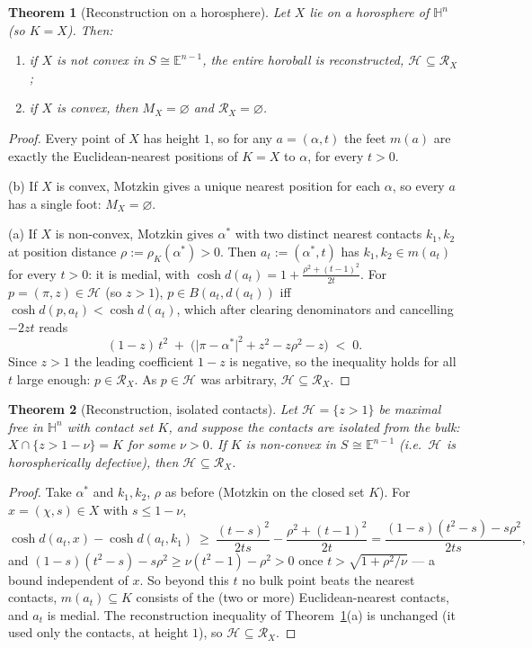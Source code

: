 \documentclass[11pt]{article}
\newtheorem{theorem}{Theorem}[section]
\theoremstyle{remark}
\newcommand{\X}{X}
\newcommand{\Mx}{M_{\X}}
\newcommand{\Rx}{\mathcal{R}_{\X}}
\newcommand{\Hb}[1]{\mathcal{H}_{#1}}
\newcommand{\Sb}[1]{S_{#1}}
\newcommand{\B}{B}
\begin{document}
\begin{theorem}[Reconstruction on a horosphere]\label{thm:hsphere}
Let $\X$ lie on a horosphere of $\mathbb{H}^{n}$ (so $K=\X$). Then:
\begin{enumerate}[label=(\alph*)]
\item if $\X$ is not convex in $\Sb{}\cong\mathbb{E}^{n-1}$, the entire
horoball is reconstructed, $\Hb{}\subseteq\Rx$;
\item if $\X$ is convex, then $\Mx=\varnothing$ and
$\Rx=\varnothing$.
\end{enumerate}
\end{theorem}

\begin{proof}
Every point of $\X$ has height $1$, so for any $a=(\alpha,t)$ the feet
$m(a)$ are exactly the Euclidean-nearest positions of $K=\X$ to
$\alpha$, for every $t>0$.

(b) If $\X$ is convex, Motzkin gives a unique nearest position for
each $\alpha$, so every $a$ has a single foot: $\Mx=\varnothing$.

(a) If $\X$ is non-convex, Motzkin gives $\alpha^{\ast}$ with two
distinct nearest contacts $k_{1},k_{2}$ at position distance
$\rho:=\rho_{K}(\alpha^{\ast})>0$. Then $a_{t}:=(\alpha^{\ast},t)$ has
$k_{1},k_{2}\in m(a_{t})$ for every $t>0$: it is medial, with
$\cosh d(a_{t})=1+\frac{\rho^{2}+(t-1)^{2}}{2t}$. For
$p=(\pi,z)\in\Hb{}$ (so $z>1$),
$p\in\B(a_{t},d(a_{t}))$ iff $\cosh d(p,a_{t})<\cosh d(a_{t})$, which
after clearing denominators and cancelling $-2zt$ reads
\[
(1-z)\,t^{2}\;+\;\bigl(\lvert\pi-\alpha^{\ast}\rvert^{2}+z^{2}-z\rho^{2}
-z\bigr)\;<\;0 .
\]
Since $z>1$ the leading coefficient $1-z$ is negative, so the
inequality holds for all $t$ large enough: $p\in\Rx$. As $p\in\Hb{}$
was arbitrary, $\Hb{}\subseteq\Rx$.
\end{proof}

\begin{theorem}[Reconstruction, isolated contacts]\label{thm:hiso}
Let $\Hb{}=\{z>1\}$ be maximal free in $\mathbb{H}^{n}$ with contact
set $K$, and suppose the contacts are \emph{isolated from the bulk}:
$\X\cap\{z>1-\nu\}=K$ for some $\nu>0$. If $K$ is non-convex in
$\Sb{}\cong\mathbb{E}^{n-1}$ (i.e.\ $\Hb{}$ is horospherically
defective), then $\Hb{}\subseteq\Rx$.
\end{theorem}

\begin{proof}
Take $\alpha^{\ast}$ and $k_{1},k_{2}$, $\rho$ as before (Motzkin on
the closed set $K$). For $x=(\chi,s)\in\X$ with $s\le1-\nu$,
\[
\cosh d(a_{t},x)-\cosh d(a_{t},k_{1})\ \ge\
\frac{(t-s)^{2}}{2ts}-\frac{\rho^{2}+(t-1)^{2}}{2t}
=\frac{(1-s)(t^{2}-s)-s\rho^{2}}{2ts},
\]
and $(1-s)(t^{2}-s)-s\rho^{2}\ge\nu(t^{2}-1)-\rho^{2}>0$ once
$t>\sqrt{1+\rho^{2}/\nu}$ --- a bound independent of $x$. So beyond
this $t$ no bulk point beats the nearest contacts, $m(a_{t})\subseteq
K$ consists of the (two or more) Euclidean-nearest contacts, and
$a_{t}$ is medial. The reconstruction inequality of
Theorem~\ref{thm:hsphere}(a) is unchanged (it used only the contacts,
at height $1$), so $\Hb{}\subseteq\Rx$.
\end{proof}
\end{document}
